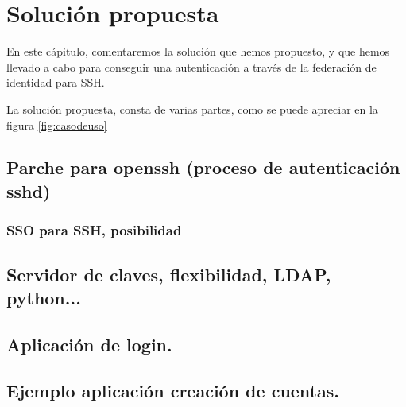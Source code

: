 \chapter{Solución propuesta}

    En este cápitulo, comentaremos la solución que hemos propuesto, y que
    hemos llevado a cabo para conseguir una autenticación a través de la
    federación de identidad para SSH.

    La solución propuesta, consta de varias partes, como se puede apreciar
    en la figura \ref{fig:casodeuso}

    \section{Parche para openssh (proceso de autenticación sshd)}
    \label{openssh}
        \subsection{SSO para SSH, posibilidad}
    \section{Servidor de claves, flexibilidad, LDAP, python...}
    \section{Aplicación de login.}
    \section{Ejemplo aplicación creación de cuentas.}
